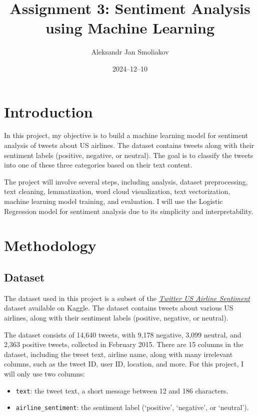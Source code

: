 \documentclass{article}
\title{Assignment 3: Sentiment Analysis using Machine Learning}
\author{Aleksandr Jan Smoliakov}
\date{2024--12--10}
\begin{document}
\maketitle

\section{Introduction}

In this project, my objective is to build a machine learning model for sentiment analysis of tweets about US airlines. The dataset contains tweets along with their sentiment labels (positive, negative, or neutral). The goal is to classify the tweets into one of these three categories based on their text content.

The project will involve several steps, including analysis, dataset preprocessing, text cleaning, lemmatization, word cloud visualization, text vectorization, machine learning model training, and evaluation. I will use the Logistic Regression model for sentiment analysis due to its simplicity and interpretability.

\section{Methodology}

\subsection{Dataset}

The dataset used in this project is a subset of the \href{https://www.kaggle.com/crowdflower/twitter-airline-sentiment}{\textit{Twitter US Airline Sentiment}} dataset available on Kaggle. The dataset contains tweets about various US airlines, along with their sentiment labels (positive, negative, or neutral).

The dataset consists of 14,640 tweets, with 9,178 negative, 3,099 neutral, and 2,363 positive tweets, collected in February 2015. There are 15 columns in the dataset, including the tweet text, airline name, along with many irrelevant columns, such as the tweet ID, user ID, location, and more. For this project, I will only use two columns:

\begin{itemize}
    \item \texttt{text}: the tweet text, a short message between 12 and 186 characters.
    \item \texttt{airline\_sentiment}: the sentiment label (`positive', `negative', or `neutral').
\end{itemize}
\end{document}

